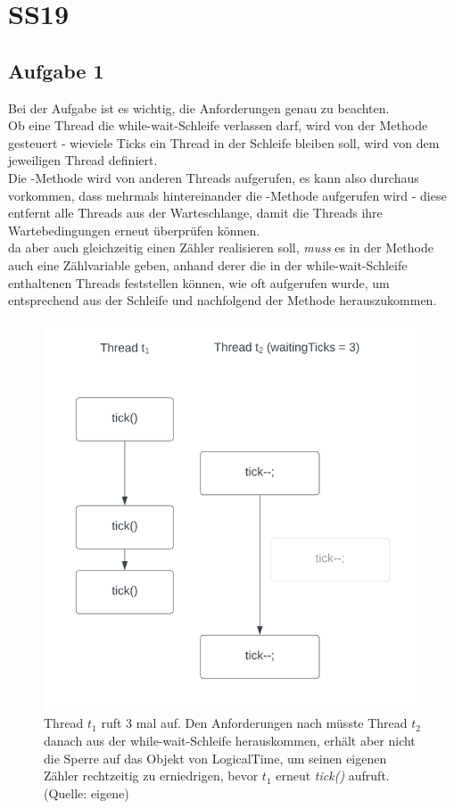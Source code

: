 \chapter{SS19}\label{ch:klausurss19}

\section{Aufgabe 1}

Bei der Aufgabe ist es wichtig, die Anforderungen genau zu beachten.\\
Ob eine Thread die while-wait-Schleife verlassen darf, wird von der Methode  gesteuert - wieviele Ticks ein Thread in der Schleife bleiben soll, wird von dem jeweiligen Thread definiert.\\
Die -Methode wird von anderen Threads aufgerufen, es kann also durchaus vorkommen, dass mehrmals hintereinander
die -Methode aufgerufen wird - diese entfernt alle Threads aus der Warteschlange, damit die Threads ihre
Wartebedingungen erneut überprüfen können.\\
da  aber auch gleichzeitig einen Zähler realisieren soll, \textit{muss} es in der Methode auch eine Zählvariable geben, anhand derer die in der while-wait-Schleife enthaltenen Threads feststellen können, wie oft  aufgerufen wurde, um entsprechend aus der Schleife und nachfolgend der Methode herauszukommen.

\begin{figure}
    \centering
    \includegraphics[scale=0.5]{chapters/Anhang/Klausuren/img/tick}
    \caption{Thread $t_1$ ruft 3 mal  auf. Den Anforderungen nach müsste Thread $t_2$ danach aus der while-wait-Schleife herauskommen, erhält aber nicht die Sperre auf das Objekt von LogicalTime, um seinen eigenen Zähler rechtzeitig zu erniedrigen, bevor $t_1$ erneut \textit{tick()} aufruft. (Quelle: eigene)}
    \label{fig:tick}
\end{figure}


